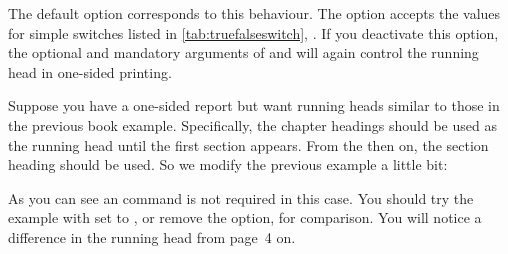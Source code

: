    The default option 
  corresponds to this behaviour. The option accepts the values for 
  simple switches listed in \autoref{tab:truefalseswitch},
  . If you deactivate this option, the 
  optional and mandatory arguments of  and 
  will again control the running head in one-sided printing.%
  \IfThisCommonLabelBase{scrlayer-scrpage}{\iftrue}{\csname
    iffalse\endcsname}%
    \begin{Example}
      Suppose you have a one-sided report but want running heads similar to
      those in the previous book example. Specifically, the chapter headings 
      should be used as the running head until the first section appears. 
      From the then on, the section heading should be used. So we modify the
      previous example a little bit:
      As you can see an  command is not
      required in this case. You should try the example with
       set to , or remove the option, for
      comparison. You will notice a difference in the running head from
      page~4 on.
    \end{Example}
  \fi

